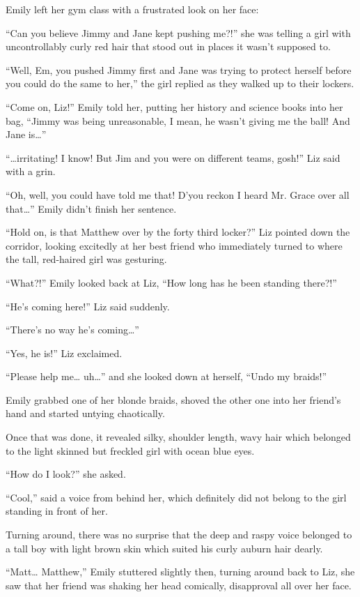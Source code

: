 Emily left her gym class with a frustrated look on her face:

“Can you believe Jimmy and Jane kept pushing me?!” she was telling a girl with uncontrollably curly red hair that stood out in places it wasn’t supposed to.

“Well, Em, you pushed Jimmy first and Jane was trying to protect herself before you could do the same to her,” the girl replied as they walked up to their lockers.

“Come on, Liz!” Emily told her, putting her history and science books into her bag, “Jimmy was being unreasonable, I mean, he wasn’t giving me the ball! And Jane is…”

“…irritating! I know! But Jim and you were on different teams, gosh!” Liz said with a grin.

“Oh, well, you could have told me that! D’you reckon I heard Mr. Grace over all that…” Emily didn’t finish her sentence.

“Hold on, is that Matthew over by the forty third locker?” Liz pointed down the corridor, looking excitedly at her best friend who immediately turned to where the tall, red-haired girl was gesturing.

“What?!” Emily looked back at Liz, “How long has he been standing there?!”

“He’s coming here!” Liz said suddenly.

“There’s no way he’s coming…”

“Yes, he is!” Liz exclaimed.

“Please help me… uh…” and she looked down at herself, “Undo my braids!”

Emily grabbed one of her blonde braids, shoved the other one into her friend’s hand and started untying chaotically.

Once that was done, it revealed silky, shoulder length, wavy hair which belonged to the light skinned but freckled girl with ocean blue eyes.

“How do I look?” she asked.

“Cool,” said a voice from behind her, which definitely did not belong to the girl standing in front of her.

Turning around, there was no surprise that the deep and raspy voice belonged to a tall boy with light brown skin which suited his curly auburn hair dearly.

“Matt… Matthew,” Emily stuttered slightly then, turning around back to Liz, she saw that her friend was shaking her head comically, disapproval all over her face.

